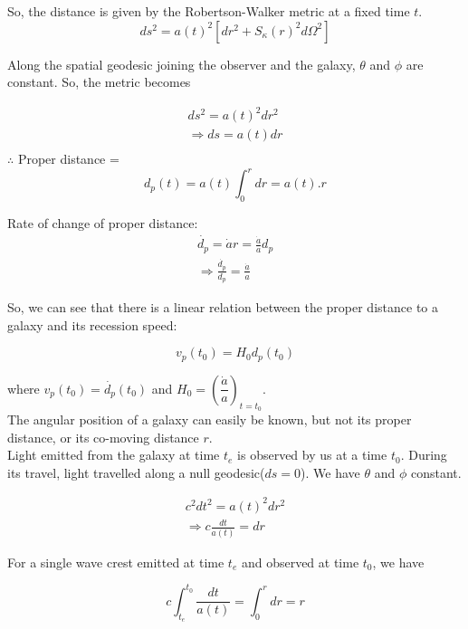 \documentclass[a4,12pt,oneside]{report}
\begin{document}
	So, the distance is given by the Robertson-Walker metric at a fixed time $ t $.
	\begin{equation}
		ds^2=a(t)^2[dr^2+S_\kappa(r)^2d\Omega^2]
	\end{equation}
	
	Along the spatial geodesic joining the observer and the galaxy, $ \theta $ and $ \phi $ are constant. So, the metric becomes
	
	\begin{align}
		ds^2=a(t)^2dr^2 \\
		\Rightarrow ds=a(t)dr \\
	\end{align}
	$\therefore$ Proper distance =\[d_p(t)=a(t)\int_0^r dr= a(t).r  \]
	
	Rate of change of proper distance:
	\begin{align}
		\dot{d_p}=\dot{a} r = \frac{\dot{a}}{a}d_p \\
		\Rightarrow \frac{\dot{d_p}}{d_p}=\frac{\dot{a}}{a}
	\end{align}
	
	So, we can see that there is a linear relation between the proper distance to a galaxy and its recession speed:
	
	\begin{equation}
		v_p(t_0)=H_0d_p(t_0)
	\end{equation}
	
	where $v_p(t_0)=\dot{d_p}(t_0)$ and $ H_0=\left(\dfrac{\dot{a}}{a}\right)_{t=t_0} $. \\
	
	
	The angular position of a galaxy can easily be known, but not its proper distance, or its co-moving distance $ r $. \\
	
	Light emitted from the galaxy at time $ t_e $ is observed by us at a time $ t_0 $. During its travel, light travelled along a null geodesic($ ds=0 $). We have $ \theta $ and $ \phi $ constant.
	
	\begin{align}
		c^2dt^2=a(t)^2dr^2 \\
		\Rightarrow c\frac{dt}{a(t)}=dr
	\end{align}
	
	For a single wave crest emitted at time $ t_e $ and observed at time $ t_0 $, we have
	
	\begin{equation}
		c\int_{t_e}^{t_0} \frac{dt}{a(t)} = \int_0^r dr = r
	\end{equation}
	
\end{document}
